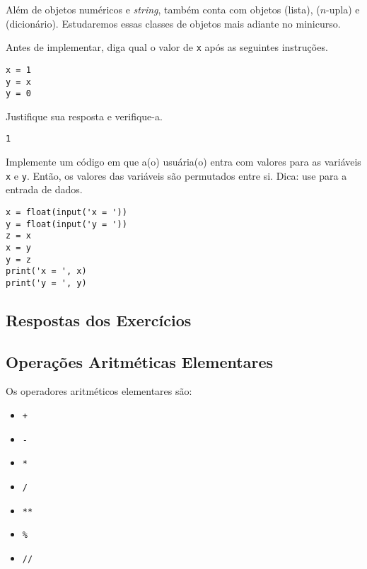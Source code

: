 Além de objetos numéricos e {\it string}, {\python} também conta com objetos {\PYTHONlist} (lista), {\PYTHONtuple} ($n$-upla) e {\PYTHONdict} (dicionário). Estudaremos essas classes de objetos mais adiante no minicurso.

\begin{exer}
  Antes de implementar, diga qual o valor de \texttt{x} após as seguintes instruções.

\begin{lstlisting}
x = 1
y = x
y = 0
\end{lstlisting}

Justifique sua resposta e verifique-a.
\end{exer}
\begin{resp}
\texttt{1}
\end{resp}

\begin{exer}
  Implemente um código em que a(o) usuária(o) entra com valores para as variáveis \texttt{x} e \texttt{y}. Então, os valores das variáveis são permutados entre si. Dica: use {\PYTHONinput} para a entrada de dados.
\end{exer}
\begin{resp}

\begin{lstlisting}
x = float(input('x = '))
y = float(input('y = '))
z = x
x = y
y = z
print('x = ', x)
print('y = ', y)
\end{lstlisting}

\end{resp}

\ifisbook 
\subsection*{Respostas dos Exercícios}
\shipoutAnswer
\fi

\subsection{Operações Aritméticas Elementares}

Os operadores aritméticos elementares são:
\begin{itemize}
\item[] \texttt{+} 
\item[] \texttt{-} 
\item[] \texttt{*} 
\item[] \texttt{/} 
\item[] \texttt{**} 
\item[] \texttt{\%} 
\item[] \texttt{//} 
\end{itemize}

